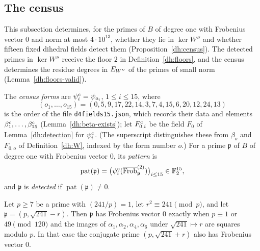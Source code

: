 \subsection{The census}\label{dh:census-section}
This subsection determines, for the primes of $B$ of degree one with
Frobenius vector $0$ and norm at most $4\cdot10^{13}$, whether they lie in
$\ker W''$ and whether fifteen fixed dihedral fields detect them
(Proposition~\ref{dh:census}). The detected primes in $\ker W''$ receive the
floor $2$ in Definition~\ref{dh:floors}, and the census determines the
residue degrees in $E_{W''}$ of the primes of small norm
(Lemma~\ref{dh:floors-valid}).

\begin{definition}\label{dh:census-basis}
The \emph{census forms} are $\psi^{\rm c}_i=\psi_{o_i}$, $1\le i\le15$, where
\[
 (o_1,\dots,o_{15})=(0,5,9,17,22,14,3,7,4,15,6,20,12,24,13)
\]
is the order of the file \texttt{d4fields15.json}, which records their data
and elements $\beta^{\rm c}_1,\dots,\beta^{\rm c}_{15}$
(Lemma~\ref{dh:beta-exists}); let $F^{\rm c}_{0,i}$ be the field $F_0$ of
Lemma~\ref{dh:detection} for $\psi^{\rm c}_i$. (The superscript distinguishes
these from $\beta_o$ and $F_{0,o}$ of Definition~\ref{dh:W}, indexed by the form
number $o$.) For a prime $\mathfrak p$ of $B$ of degree one with
Frobenius vector $0$, its \emph{pattern} is
\[
 \operatorname{pat}(\mathfrak p)
 =\bigl(\psi^{\rm c}_i(\overline{\operatorname{Frob}}^{(2)}_{\mathfrak p})\bigr)_{i\le15}
 \in\mathbb F_2^{15},
\]
and $\mathfrak p$ is \emph{detected} if $\operatorname{pat}(\mathfrak p)\ne0$.
\end{definition}

\begin{lemma}\label{dh:vector-zero}
Let $p\ge7$ be a prime with $(241/p)=1$, let $r^2\equiv241\pmod p$, and let
$\mathfrak p=(p,\sqrt{241}-r)$. Then $\mathfrak p$ has Frobenius vector $0$
exactly when $p\equiv1$ or $49\pmod{120}$ and the images of
$\alpha_1,\alpha_2,\alpha_4,\alpha_6$ under $\sqrt{241}\mapsto r$ are squares
modulo $p$. In that case the conjugate prime $(p,\sqrt{241}+r)$ also has
Frobenius vector $0$.
\end{lemma}

